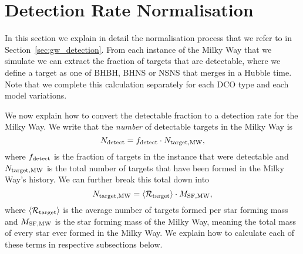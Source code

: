 \section{Detection Rate Normalisation}\label{app:rate_normalisation}
In this section we explain in detail the normalisation process that we refer to in Section~\ref{sec:gw_detection}. From each instance of the Milky Way that we simulate we can extract the fraction of targets that are detectable, where we define a target as one of BHBH, BHNS or NSNS that merges in a Hubble time. Note that we complete this calculation separately for each DCO type and each model variations.

We now explain how to convert the detectable fraction to a detection rate for the Milky Way. We write that the \textit{number} of detectable targets in the Milky Way is
\begin{equation}\label{eq:norm_frame}
    N_{\rm detect} = f_{\rm detect} \cdot N_{\rm target, MW},
\end{equation}
where $f_{\rm detect}$ is the fraction of targets in the instance that were detectable and $N_{\rm target, MW}$ is the total number of targets that have been formed in the Milky Way's history. We can further break this total down into
\begin{equation}
    N_{\rm target, MW} = \avg{ \mathcal{R}_{\rm target} } \cdot M_{\rm SF, MW},
\end{equation}
where $\left\langle \mathcal{R}_{\rm target} \right\rangle$ is the average number of targets formed per star forming mass and $M_{\rm SF, MW}$ is the star forming mass of the Milky Way, meaning the total mass of every star ever formed in the Milky Way. We explain how to calculate each of these terms in respective subsections below.

